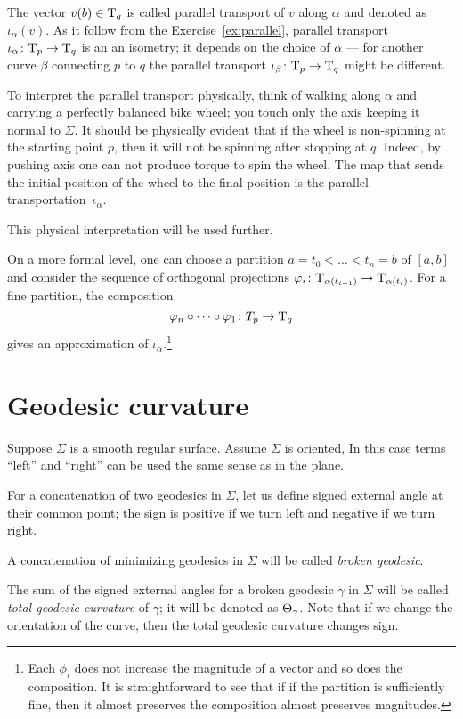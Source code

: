 The vector $v(b)\in\mathrm{T}_q$ is called parallel transport of $v$ along $\alpha$ and denoted as $\iota_\alpha(v)$.
As it follow from the Exercise~\ref{ex:parallel}, parallel transport $\iota_\alpha\colon\mathrm{T}_p\to\mathrm{T}_q$ is an an isometry;
it depends on the choice of $\alpha$ --- for another curve $\beta$ connecting $p$ to $q$ the parallel transport $\iota_\beta\colon\mathrm{T}_p\to\mathrm{T}_q$ might be different.

To interpret the parallel transport physically, 
think of walking along $\alpha$ and carrying a perfectly balanced bike wheel;
you touch only the axis keeping it normal to $\Sigma$.
It should be physically evident that if the wheel is non-spinning at the starting point $p$, then it will not be spinning after stopping at $q$.
Indeed, by pushing axis one can not produce torque to spin the wheel. 
The map that sends the initial position of the wheel to the final position is  the parallel transportation~$\iota_\alpha$.

This physical interpretation will be used further.

On a more formal level, one can choose a partition $a=t_0<\dots<t_n=b$ of $[a,b]$
and consider the sequence of orthogonal projections $\varphi_i\colon\mathrm{T}_{\alpha(t_{i-1})}\to\mathrm{T}_{\alpha(t_i)}$.
For a fine partition, the composition 
\[\phi_n\circ\dots\circ\phi_1\:T_p\z\to\T_q\]
gives an approximation of $\iota_\alpha$.\footnote{Each $\phi_i$ does not increase the magnitude of a vector and so does the composition.
It is straightforward to see that if if the partition is sufficiently fine, then it almost preserves the composition almost preserves magnitudes.}

\section{Geodesic curvature}

Suppose $\Sigma$ is a smooth regular surface.
Assume $\Sigma$ is oriented,
In this case terms ``left'' and ``right'' can be used the same sense as in the plane.

For a concatenation of two geodesics in $\Sigma$, let us define signed external angle at their common point;
the sign is positive if we turn left and negative if we turn right. 

A concatenation of minimizing geodesics in $\Sigma$ will be called \emph{broken geodesic}.

The sum of the signed external angles for a broken geodesic $\gamma$ in $\Sigma$ will be called \emph{total geodesic curvature} of $\gamma$; it will be denoted as $\Theta_{\gamma}$.
Note that if we change the orientation of the curve, then the total geodesic curvature changes sign.

